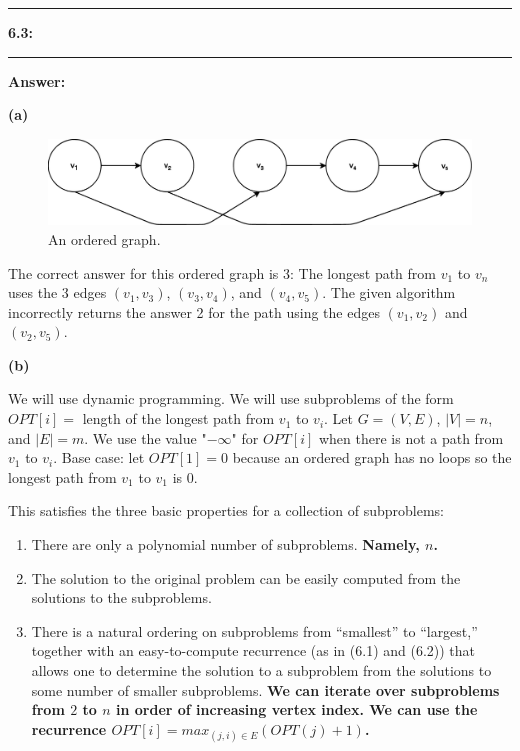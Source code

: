 \documentclass[11pt]{article}
\newcommand\question[2]{\vspace{.25in}\hrule\textbf{#1: #2}\vspace{.5em}\hrule\vspace{.10in}}
\renewcommand\part[1]{\vspace{.10in}\textbf{(#1)}}
\newcommand\answer{\vspace{.10in}\textbf{Answer: }}
\begin{document}
\raggedright
\newcommand\NAME{Stewart Dulaney}  %
\newcommand\SID{904-064-791}     %
\newcommand\HWNUM{5}              %

\question{6.3}{}

\answer

\part{a}

\begin{figure}[h!]
  \centering
  \includegraphics[width=\linewidth]{6.3a.eps}
  \caption{An ordered graph.}
  \label{fig:6.3a}
\end{figure}

The correct answer for this ordered graph is 3: The longest path from $v_1$ to $v_n$ uses the 3 edges $(v_1, v_3)$, $(v_3, v_4)$, and $(v_4, v_5)$. The given algorithm incorrectly returns the answer 2 for the path using the edges $(v_1, v_2)$ and $(v_2, v_5)$. 

\part{b}

We will use dynamic programming. We will use subproblems of the form $OPT[i] = $ length of the longest path from $v_1$ to $v_i$. Let $G = (V, E)$, $|V| = n$, and $|E| = m$. We use the value "$-\infty$" for $OPT[i]$ when there is not a path from $v_1$ to $v_i$. Base case: let $OPT[1] = 0$ because an ordered graph has no loops so the longest path from $v_1$ to $v_1$ is $0$.

This satisfies the three basic properties for a collection of subproblems:
\begin{enumerate}
  \item There are only a polynomial number of subproblems. \textbf{Namely, $n$.}
  \item The solution to the original problem can be easily computed from the solutions to the subproblems. \textbf{}
  \item There is a natural ordering on subproblems from “smallest” to “largest,” together with an easy-to-compute recurrence (as in (6.1) and (6.2)) that allows one to determine the solution to a subproblem from the solutions to some number of smaller subproblems. \textbf{We can iterate over subproblems from $2$ to $n$ in order of increasing vertex index. We can use the recurrence $OPT[i] = max_{(j, i) \in E}(OPT(j) + 1)$.}
\end{enumerate}
\end{document}
